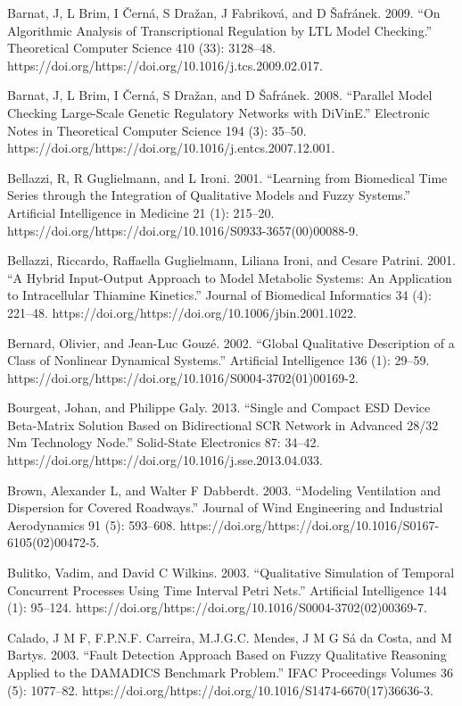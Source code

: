 \documentclass[utf8]{gradu3}
\begin{document}
Barnat, J, L Brim, I Černá, S Dražan, J Fabriková, and D Šafránek. 2009. “On Algorithmic Analysis of Transcriptional Regulation by LTL Model Checking.” Theoretical Computer Science 410 (33): 3128–48. https://doi.org/https://doi.org/10.1016/j.tcs.2009.02.017.

Barnat, J, L Brim, I Černá, S Dražan, and D Šafránek. 2008. “Parallel Model Checking Large-Scale Genetic Regulatory Networks with DiVinE.” Electronic Notes in Theoretical Computer Science 194 (3): 35–50. https://doi.org/https://doi.org/10.1016/j.entcs.2007.12.001.

Bellazzi, R, R Guglielmann, and L Ironi. 2001. “Learning from Biomedical Time Series through the Integration of Qualitative Models and Fuzzy Systems.” Artificial Intelligence in Medicine 21 (1): 215–20. https://doi.org/https://doi.org/10.1016/S0933-3657(00)00088-9.

Bellazzi, Riccardo, Raffaella Guglielmann, Liliana Ironi, and Cesare Patrini. 2001. “A Hybrid Input-Output Approach to Model Metabolic Systems: An Application to Intracellular Thiamine Kinetics.” Journal of Biomedical Informatics 34 (4): 221–48. https://doi.org/https://doi.org/10.1006/jbin.2001.1022.

Bernard, Olivier, and Jean-Luc Gouzé. 2002. “Global Qualitative Description of a Class of Nonlinear Dynamical Systems.” Artificial Intelligence 136 (1): 29–59. https://doi.org/https://doi.org/10.1016/S0004-3702(01)00169-2.

Bourgeat, Johan, and Philippe Galy. 2013. “Single and Compact ESD Device Beta-Matrix Solution Based on Bidirectional SCR Network in Advanced 28/32 Nm Technology Node.” Solid-State Electronics 87: 34–42. https://doi.org/https://doi.org/10.1016/j.sse.2013.04.033.

Brown, Alexander L, and Walter F Dabberdt. 2003. “Modeling Ventilation and Dispersion for Covered Roadways.” Journal of Wind Engineering and Industrial Aerodynamics 91 (5): 593–608. https://doi.org/https://doi.org/10.1016/S0167-6105(02)00472-5.

Bulitko, Vadim, and David C Wilkins. 2003. “Qualitative Simulation of Temporal Concurrent Processes Using Time Interval Petri Nets.” Artificial Intelligence 144 (1): 95–124. https://doi.org/https://doi.org/10.1016/S0004-3702(02)00369-7.

Calado, J M F, F.P.N.F. Carreira, M.J.G.C. Mendes, J M G Sá da Costa, and M Bartys. 2003. “Fault Detection Approach Based on Fuzzy Qualitative Reasoning Applied to the DAMADICS Benchmark Problem.” IFAC Proceedings Volumes 36 (5): 1077–82. https://doi.org/https://doi.org/10.1016/S1474-6670(17)36636-3.
\end{document}
